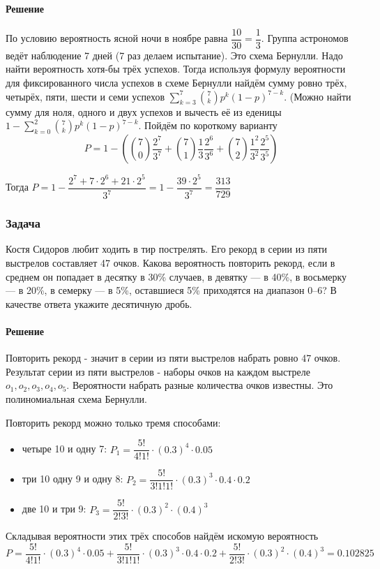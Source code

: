\documentclass[a4paper,12pt]{article}
\begin{document}
\paragraph{Решение}
По условию вероятность ясной ночи в ноябре равна  \( \dfrac{10}{30} = \dfrac{1}{3} \). Группа астрономов ведёт наблюдение 7 дней (7 раз делаем испытание). Это схема Бернулли. Надо найти вероятность хотя-бы трёх успехов. Тогда используя формулу вероятности для фиксированного числа успехов в схеме Бернулли найдём сумму ровно трёх, четырёх, пяти, шести и семи успехов  \( \sum_{k=3}^{7} \binom{7}{k} p^k(1-p)^{7-k} \). (Можно найти сумму для ноля, одного и двух успехов и вычесть её из еденицы \( 1-\sum_{k=0}^{2} \binom{7}{k} p^k(1-p)^{7-k}\). Пойдём по  короткому варианту
\[ P = 1 - \left( \binom{7}{0} \dfrac{2^7}{3^7} + \binom{7}{1} \dfrac{1}{3}\dfrac{2^6}{3^6} + \binom{7}{2} \dfrac{1^2}{3^2}\dfrac{2^5}{3^5} \right)\]

Тогда \( P = 1 - \dfrac{2^7 + 7\cdot 2^6 + 21 \cdot 2^5}{3^7} = 1 - \dfrac{39 \cdot 2^5}{3^7} = \dfrac{313}{729} \)

\subsubsection*{Задача}
Костя Сидоров любит ходить в тир пострелять. Его рекорд в серии из пяти выстрелов составляет 47 очков. Какова вероятность повторить рекорд, если в среднем он попадает в десятку в 30\% случаев, в девятку — в 40\%, в восьмерку — в 20\%, в семерку — в 5\%, оставшиеся 5\% приходятся на диапазон 0–6? В качестве ответа укажите десятичную дробь.
\paragraph{Решение}
Повторить рекорд - значит в серии из пяти выстрелов набрать ровно 47 очков. Результат серии из пяти выстрелов - наборы очков на каждом выстреле \(o_1, o_2, o_3, o_4, o_5\). Вероятности набрать разные количества очков известны. Это полиномиальная схема Бернулли.

Повторить рекорд можно только тремя способами:
\begin{itemize}
	\item четыре 10 и одну 7: \(P_1 = \dfrac{5!}{4!1!} \cdot (0.3)^4 \cdot 0.05\)
	\item три 10 одну 9 и одну 8: \(P_2 = \dfrac{5!}{3!1!1!} \cdot (0.3)^3 \cdot 0.4 \cdot 0.2\)
	\item две 10 и три 9: \(P_3 = \dfrac{5!}{2!3!} \cdot (0.3)^2 \cdot (0.4)^3\)
\end{itemize}
Складывая вероятности этих трёх способов найдём искомую вероятность \( P = \dfrac{5!}{4!1!} \cdot (0.3)^4 \cdot 0.05 + \dfrac{5!}{3!1!1!} \cdot (0.3)^3 \cdot 0.4 \cdot 0.2 + \dfrac{5!}{2!3!} \cdot (0.3)^2 \cdot (0.4)^3 = 0.102825 \)
\end{document}
